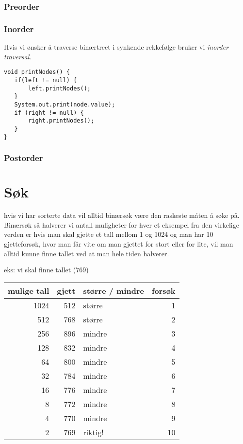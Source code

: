 \documentclass[a4paper,norsk,10pt]{article}
\begin{document}
\subsubsection{Preorder}
\label{sec-13.2.1}
\subsubsection{Inorder}
\label{sec-13.2.2}

Hvis vi ønsker å traverse binærtreet i synkende rekkefølge bruker vi
\emph{inorder traversal}.

\begin{verbatim}
void printNodes() {
   if(left != null) {
       left.printNodes();
   }
   System.out.print(node.value);
   if (right != null) {
       right.printNodes();
   }
}
\end{verbatim}
\subsubsection{Postorder}
\label{sec-13.2.3}
\section{Søk}
\label{sec-14}

  hvis vi har sorterte data vil alltid binærsøk være den raskeste måten
  å søke på. Binærsøk så halverer vi antall muligheter for hver et eksempel
  fra den virkelige verden er hvis man skal gjette et tall mellom 1 og 1024
  og man har 10 gjetteforsøk, hvor man får vite om man gjettet for stort eller
  for lite, vil man alltid kunne finne tallet ved at man hele tiden halverer.

  eks: vi skal finne tallet (769)

\begin{center}
\begin{tabular}{rrlr}
\hline
 mulige tall  &  gjett  &  større / mindre  &  forsøk  \\
\hline
        1024  &    512  &  større           &       1  \\
\hline
         512  &    768  &  større           &       2  \\
\hline
         256  &    896  &  mindre           &       3  \\
\hline
         128  &    832  &  mindre           &       4  \\
\hline
          64  &    800  &  mindre           &       5  \\
\hline
          32  &    784  &  mindre           &       6  \\
\hline
          16  &    776  &  mindre           &       7  \\
\hline
           8  &    772  &  mindre           &       8  \\
\hline
           4  &    770  &  mindre           &       9  \\
\hline
           2  &    769  &  riktig!          &      10  \\
\hline
\end{tabular}
\end{center}
\end{document}
